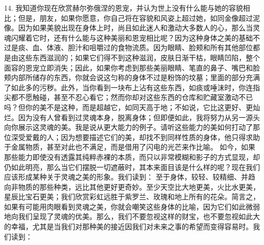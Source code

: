 14. 我知道你现在欣赏赫尔弥俄涅的恩宠，并认为世上没有什么能与她的容貌相比；但是，朋友，如果你愿意，你自己将在容貌和风姿上超过她，如同金像超过泥像。因为如果美貌出现在身体上时，尚且如此迷人和激动大多数人的心，那么当灵魂闪耀着它时，还有什么能与这种美丽和恩宠相比呢？因为这种身体之美的基础不过是痰、血、体液、胆汁和咀嚼过的食物流质。因为眼睛、脸颊和所有其他部位都是由这些东西滋润的；如果它们得不到这种滋润，皮肤日渐干枯，眼睛凹陷，整个面容的恩宠立即消失；因此，如果你考虑到那些美丽眼睛、笔直的鼻子、嘴巴和脸颊内部所储存的东西，你就会说这匀称的身体不过是粉饰的坟墓；里面的部分充满了如此多的污秽。此外，当你看到一块布上沾有这些东西，如痰或唾沫时，你连指尖都不愿触碰，甚至不忍心看它；然而你却对这些东西的仓库和贮藏室激动不已吗？但你的美不是这种，而是超越它，如同天高于地；不如说，它比这更好、更灿烂。因为没有人曾看到过灵魂本身，脱离身体；但即便如此，我将努力从另一源头向你展示这灵魂的美。我是说从更大能力的例子。请听这些能力的美如何打动了那位深受爱戴的人；因为想要描述它们的美，却找不到同样性质的身体，他只得求助于金属物质，甚至对此也不满足，而是借用了闪电的光芒来作比喻。 如今，如果那些能力即使没有透露其纯粹赤裸的本质，而只以非常模糊和影子的方式显现，却仍如此明亮，那么当它们摆脱一切遮蔽时，其本来面目该是什么样的呢？现在我们应该形成某种关于灵魂之美的形象。我们读到：  至于身体，较轻、较精细、并趋向非物质的那些种类，远比其他更好更奇妙。至少天空比大地更美，火比水更美，星辰比宝石更美；我们欣赏彩虹远胜于紫罗兰、玫瑰和地上所有的花朵。简言之，如果有可能用肉眼看到灵魂之美，你就会嘲笑这些身体的比喻，因为它们如此微弱地向我们呈现了灵魂的优美。那么，我们不要忽视这样的财宝，也不要忽视如此大的幸福，尤其是当我们对那种美的接近因我们对未来之事的希望而变得容易时。我们读到：  